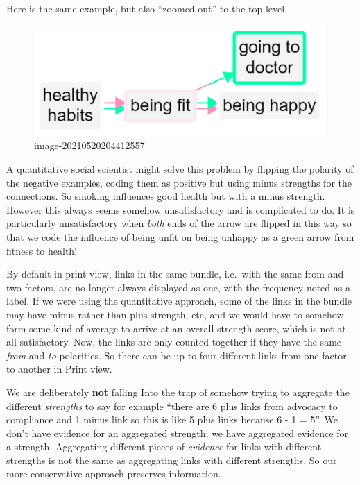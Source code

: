 \documentclass[
]{book}
\begin{document}
Here is the same example, but also ``zoomed out'' to the top level.

\begin{figure}
\centering
\includegraphics{_assets/image-20210520204412557.png}
\caption{image-20210520204412557}
\end{figure}

A quantitative social scientist might solve this problem by flipping the polarity of the negative examples, coding them as positive but using minus strengths for the connections. So smoking influences good health but with a minus strength. However this always seems somehow unsatisfactory and is complicated to do. It is particularly unsatisfactory when \emph{both} ends of the arrow are flipped in this way so that we code the influence of being unfit on being unhappy as a green arrow from fitness to health!

By default in print view, links in the same bundle, i.e.~with the same from and two factors, are no longer always displayed as one, with the frequency noted as a label. If we were using the quantitative approach, some of the links in the bundle may have minus rather than plus strength, etc, and we would have to somehow form some kind of average to arrive at an overall strength score, which is not at all satisfactory. Now, the links are only counted together if they have the same \emph{from} and \emph{to} polarities. So there can be up to four different links from one factor to another in Print view.

We are deliberately \textbf{not} falling Into the trap of somehow trying to aggregate the different \emph{strengths} to say for example ``there are 6 plus links from advocacy to compliance and 1 minus link so this is like 5 plus links because 6 - 1 = 5''. We don't have evidence for an aggregated strength; we have aggregated evidence for a strength. Aggregating different pieces of \emph{evidence} for links with different strengths is not the same as aggregating links with different strengths. So our more conservative approach preserves information.
\end{document}
